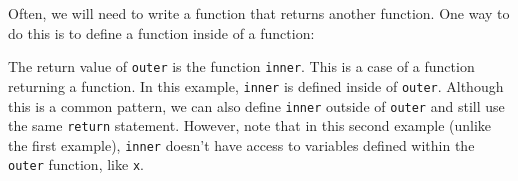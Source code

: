 Often, we will need to write a function that returns another function. One way
to do this is to define a function inside of a function:



The return value of \texttt{outer} is the function \texttt{inner}. This is a
case of a function returning a function. In this example, \texttt{inner} is
defined inside of \texttt{outer}. Although this is a common pattern, we can also
define \texttt{inner} outside of \texttt{outer} and still use the same
\texttt{return} statement. However, note that in this second example (unlike the
first example), \texttt{inner} doesn't have access to variables defined within
the \texttt{outer} function, like \texttt{x}.

